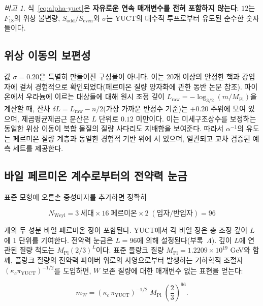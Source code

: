 \documentclass[12pt,a4paper]{article}
\theoremstyle{remark}
\newtheorem{remark}[theorem]{비고}
\begin{document}
	\begin{remark}
		식~\eqref{eq:alpha-yuct}은 \textbf{자유로운 연속 매개변수를 전혀 포함하지 않는다}: \(12\)는 \(F_{18}\)의 위상 불변량, \(S_{\mathrm{odd}}/S_{\mathrm{even}}\)와 \(\sigma\)는 YUCT의 대수적 루프로부터 유도된 순수한 숫자들이다.
	\end{remark}
	
	\subsection{위상 이동의 보편성}
	
	값 \(\sigma = 0.20\)은 특별히 만들어진 구성물이 아니다. 이는 20개 이상의 안정한 핵과 강입자에 걸쳐 경험적으로 확인되었다(페르미온 질량 양자화에 관한 동반 논문 참조). 파이온에서 우라늄에 이르는 대상들에 대해 원시 조정 깊이 \(L_{\mathrm{raw}} = -\log_{3/2}(m/M_{\mathrm{Pl}})\)을 계산할 때, 잔차 \(\delta L = L_{\mathrm{raw}} - n/2\)(가장 가까운 반정수 기준)는 \(+0.20\) 주위에 모여 있으며, 제곱평균제곱근 분산은 \(L\) 단위로 \(0.12\) 미만이다. 이는 미세구조상수를 보정하는 동일한 위상 이동이 복합 물질의 질량 사다리도 지배함을 보여준다. 따라서 \(\alpha^{-1}\)의 유도는 페르미온 질량 계층과 동일한 경험적 기반 위에 서 있으며, 일관되고 교차 검증된 예측 세트를 제공한다.
	
	\subsection{바일 페르미온 계수로부터의 전약력 눈금}
	
	표준 모형에 오른손 중성미자를 추가하면 정확히
	
	\begin{equation}
		N_{\mathrm{Weyl}} = 3\;\text{세대} \times 16\;\text{페르미온}
		\times 2\;(\text{입자/반입자}) = 96
	\end{equation}
	
	개의 두 성분 바일 페르미온 장이 포함된다. YUCT에서 각 바일 장은 총 조정 깊이 \(L\)에 1 단위를 기여한다. 전약력 눈금은 \(L = 96\)에 의해 설정된다(부록~\(\Lambda\)). 깊이 \(L\)에 연관된 질량 척도는 \(M_{\mathrm{Pl}} (2/3)^{L}\)이다. 표준 플랑크 질량 \(M_{\mathrm{Pl}} = 1.2209 \times 10^{19}\) GeV와 함께, 플랑크 질량의 전약력 파이버 위로의 사영으로부터 발생하는 기하학적 조절자 \((\kappa_c \pi_{\mathrm{YUCT}})^{-1/2}\)를 도입하면, \(W\) 보존 질량에 대한 매개변수 없는 표현을 얻는다:
	
	\begin{equation}
		\boxed{m_W = \left( \kappa_c \, \pi_{\mathrm{YUCT}} \right)^{-1/2}
			\; M_{\mathrm{Pl}} \; \left( \frac{2}{3} \right)^{96}}.
		\label{eq:mw-corrected}
	\end{equation}
	
\end{document}
